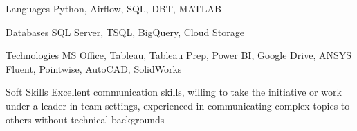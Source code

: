 
\begin{cvskills}
  \cvskill
    {Languages} %
    {Python, Airflow, SQL, DBT, MATLAB} %
  
  \cvskill
    {Databases} %
    {SQL Server, TSQL, BigQuery, Cloud Storage} %
    
  \cvskill
    {Technologies} %
    {MS Office, Tableau, Tableau Prep, Power BI, Google Drive, ANSYS Fluent, Pointwise, AutoCAD, SolidWorks} %
    
  \cvskill
    {Soft Skills} %
    {Excellent communication skills, willing to take the initiative or work under a leader in team settings, experienced in communicating complex topics to others without technical backgrounds}
\end{cvskills}
